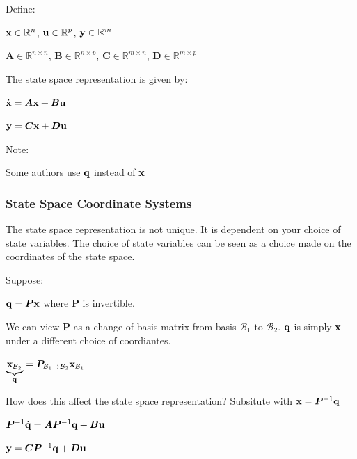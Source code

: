 \documentclass[11pt]{article}
\begin{document}
  \vspace{12pt}

  Define:

  \(\mathbf{x} \in \mathbb{R}^n\),
  \(\mathbf{u} \in \mathbb{R}^p\),
  \(\mathbf{y} \in \mathbb{R}^m\)

  \(\bm{A} \in \mathbb{R}^{n \times n}\),
  \(\bm{B} \in \mathbb{R}^{n \times p}\),
  \(\bm{C} \in \mathbb{R}^{m \times n}\),
  \(\bm{D} \in \mathbb{R}^{m \times p}\)

  \vspace{12pt}

  The state space representation is given by:

  \(\dot{\mathbf{x}} = \bm{A}\mathbf{x} + \bm{B}\mathbf{u}\)

  \(\mathbf{y} = \bm{C}\mathbf{x} + \bm{D}\mathbf{u}\)

  \vspace{12pt}

  Note:

  Some authors use \(\mathbf{q}\) instead of \(\mathbf{x}\)

  \subsubsection{State Space Coordinate Systems}
  \label{state-space-coord}

  The state space representation is not unique. It is dependent on your choice of state variables.
  The choice of state variables can be seen as a choice made on the coordinates of the state space.

  \vspace{12pt}

  Suppose:

  \(\mathbf{q} = \bm{P}\mathbf{x}\) where \(\bm{P}\) is invertible.

  We can view \(\bm{P}\) as a change of basis matrix from basis \(\mathcal{B}_1\) to \(\mathcal{B}_2\). \(\mathbf{q}\) is
  simply \(\mathbf{x}\) under a different choice of coordiantes.

  \(\underbrace{\mathbf{x}_{\mathcal{B}_2}}_{\mathbf{q}} = \bm{P}_{\mathcal{B}_1 \to \mathcal{B}_2}\mathbf{x}_{\mathcal{B}_1}\)

  How does this affect the state space representation? Subsitute with \(\mathbf{x} = \bm{P}^{-1}\mathbf{q}\)

  \(\bm{P}^{-1}\dot{\mathbf{q}} = \bm{A}\bm{P}^{-1}\mathbf{q} + \bm{B}\mathbf{u}\)

  \(\mathbf{y} = \bm{C}\bm{P}^{-1}\mathbf{q} + \bm{D}\mathbf{u}\)
\end{document}
